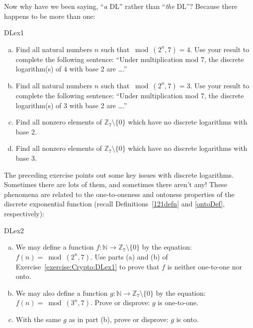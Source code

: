  Now why have we been saying, ``\emph{a} DL'' rather than ``\emph{the} DL''? Because  there happens to be more than one:

\begin{exercise}{DLex1}
\begin{enumerate}[(a)]
\item
Find all natural numbers $n$ such that $\bmod(2^n,7)=4$.  Use your result to complete the following sentence: ``Under multiplication mod 7, the discrete logarithm(s) of $4$ with base 2  are \ldots.''
\item
Find all natural numbers $n$ such that $\bmod(2^n,7)=3$.  Use your result to complete the following sentence:  ``Under multiplication mod 7, the discrete logarithm(s) of $3$ with base 2 are \ldots.''
\item
Find all nonzero elements of $\mathbb{Z}_7 \setminus \{0\}$ which have no discrete logarithms with base 2.
\item
Find all nonzero elements of $\mathbb{Z}_7 \setminus \{0\}$ which have no discrete logarithms with base 3.
\end{enumerate}
\end{exercise}

The preceding exercise points out some key issues with discrete logarithms. Sometimes there are lots of them, and sometimes there aren't any! These phenomena are related to the one-to-oneness and ontoness properties of  the discrete exponential function (recall Definitions~\ref{121defn} and \ref{ontoDef}, respectively):

\begin{exercise}{DLex2}
\begin{enumerate}[(a)]
\item
We may define a function $f: \mathbb{N} \rightarrow \mathbb{Z}_7 \setminus \{0\}$ by the equation: $f(n) = \bmod(2^n,7)$. 
Use parts (a) and (b) of Exercise~\ref{exercise:Crypto:DLex1} to prove that $f$ is neither one-to-one nor onto.
\item
We may also define a function $g: \mathbb{N} \rightarrow \mathbb{Z}_7 \setminus \{0\}$ by the equation: $f(n) = \bmod(3^n,7)$. 
Prove or disprove: $g$ is one-to-one.
\item
With the same $g$ as in part (b), prove or disprove: $g$ is onto.
\end{enumerate}
\end{exercise}

